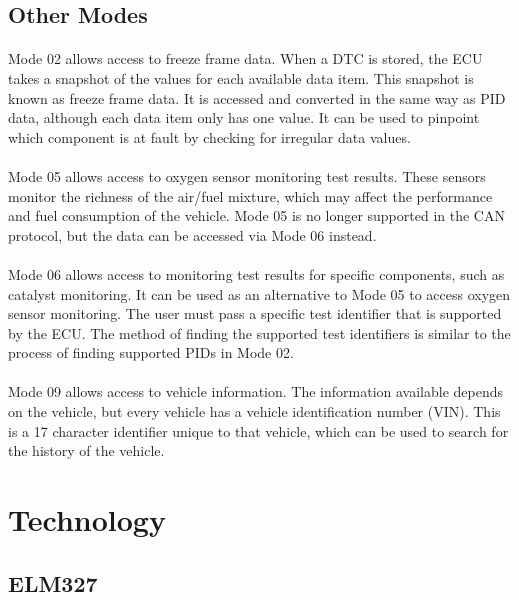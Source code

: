 	\subsection{Other Modes}{
		\paragraph{}{
		Mode 02 allows access to freeze frame data. When a DTC is stored, the ECU takes a snapshot of the values for each available data item. This snapshot is known as freeze frame data. It is accessed and converted in the same way as PID data, although each data item only has one value. It can be used to pinpoint which component is at fault by checking for irregular data values.
		}		
		\paragraph{}{
		Mode 05 allows access to oxygen sensor monitoring test results. These sensors monitor the richness of the air/fuel mixture, which may affect the performance and fuel consumption of the vehicle. Mode 05 is no longer supported in the CAN protocol, but the data can be accessed via Mode 06 instead.
		}
		\paragraph{}{
		Mode 06 allows access to monitoring test results for specific components, such as catalyst monitoring. It can be used as an alternative to Mode 05 to access oxygen sensor monitoring. The user must pass a specific test identifier that is supported by the ECU. The method of finding the supported test identifiers is similar to the process of finding supported PIDs in Mode 02. 
		}
		\paragraph{}{
		Mode 09 allows access to vehicle information. The information available depends on the vehicle, but every vehicle has a vehicle identification number (VIN). This is a 17 character identifier unique to that vehicle, which can be used to search for the history of the vehicle. 
		}
	}
	\label{ssec:OtherModes}

\section{Technology}
	\subsection{ELM327}
